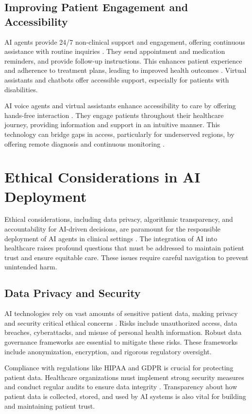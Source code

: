\documentclass[12pt,a4paper]{article}
\begin{document}
\subsection{Improving Patient Engagement and Accessibility}
AI agents provide 24/7 non-clinical support and engagement, offering continuous assistance with routine inquiries \cite{alation.com}. They send appointment and medication reminders, and provide follow-up instructions. This enhances patient experience and adherence to treatment plans, leading to improved health outcomes \cite{theintellify.com}. Virtual assistants and chatbots offer accessible support, especially for patients with disabilities.

AI voice agents and virtual assistants enhance accessibility to care by offering hands-free interaction \cite{heidihealth.com}. They engage patients throughout their healthcare journey, providing information and support in an intuitive manner. This technology can bridge gaps in access, particularly for underserved regions, by offering remote diagnosis and continuous monitoring \cite{intellias.com}.

\section{Ethical Considerations in AI Deployment}
Ethical considerations, including data privacy, algorithmic transparency, and accountability for AI-driven decisions, are paramount for the responsible deployment of AI agents in clinical settings \cite{omnicuris.com}. The integration of AI into healthcare raises profound questions that must be addressed to maintain patient trust and ensure equitable care. These issues require careful navigation to prevent unintended harm.

\subsection{Data Privacy and Security}
AI technologies rely on vast amounts of sensitive patient data, making privacy and security critical ethical concerns \cite{deepscribe.ai}. Risks include unauthorized access, data breaches, cyberattacks, and misuse of personal health information. Robust data governance frameworks are essential to mitigate these risks. These frameworks include anonymization, encryption, and rigorous regulatory oversight.

Compliance with regulations like HIPAA and GDPR is crucial for protecting patient data. Healthcare organizations must implement strong security measures and conduct regular audits to ensure data integrity \cite{nih_ethical_implications}. Transparency about how patient data is collected, stored, and used by AI systems is also vital for building and maintaining patient trust.
\end{document}
